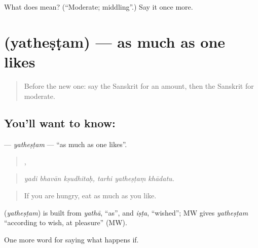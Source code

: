 \begin{tcolorbox}[breakable,colback=teal!4,colframe=teal!35!black,title={Before you move on}]
What does  mean? (\textquotedblleft{}Moderate; middling\textquotedblright{}.) Say it once more.
\end{tcolorbox}
\section[\texorpdfstring{\sk{यथेष्टम्} (yatheṣṭam)}{यथेष्टम् (yatheṣṭam)}]{ (yatheṣṭam) — as much as one likes}

\label{lesson:SA-C380-yathestam}



\begin{quote}
Before the new one: say the Sanskrit for an amount, then the Sanskrit for moderate.
\end{quote}

\subsection*{You'll want to know: }
\textbf{} — \emph{yatheṣṭam} — \textquotedblleft{}as much as one likes\textquotedblright{}.

\begin{quote}
  ,   
\end{quote}

\begin{quote}
\emph{yadi bhavān kṣudhitaḥ, tarhi yatheṣṭaṃ khādatu.}
\end{quote}

\begin{quote}
If you are hungry, eat as much as you like.
\end{quote}

\begin{cousinweb}
\textbf{} (\emph{yatheṣṭam}) is built from \emph{yathā}, \textquotedblleft{}as\textquotedblright{}, and \emph{iṣṭa}, \textquotedblleft{}wished\textquotedblright{}; MW gives \emph{yatheṣṭam} \textquotedblleft{}according to wish, at pleasure\textquotedblright{} (MW).
\end{cousinweb}

\begin{grammarlens}[title={What you've built}]
One more word for saying what happens if.
\end{grammarlens}

